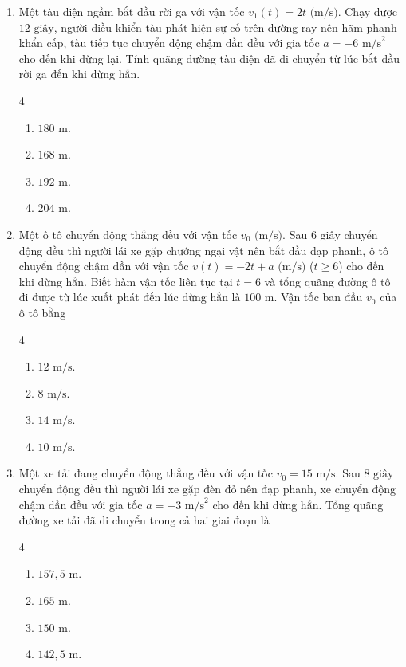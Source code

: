 \documentclass[12pt]{article}
\begin{document}
\begin{enumerate}[label=\textbf{Câu \arabic*.}]
		\item Một tàu điện ngầm bắt đầu rời ga với vận tốc $v_1(t) = 2t\text{ (m/s)}$. Chạy được $12\text{ giây}$, người điều khiển tàu phát hiện sự cố trên đường ray nên hãm phanh khẩn cấp, tàu tiếp tục chuyển động chậm dần đều với gia tốc $a = -6\text{ m/s}^2$ cho đến khi dừng lại. Tính quãng đường tàu điện đã di chuyển từ lúc bắt đầu rời ga đến khi dừng hẳn.
		\begin{multicols}{4}
			\begin{enumerate}[label=\textbf{\Alph*.}]
				\item $180\text{ m}$.
				\item $168\text{ m}$.
				\item $192\text{ m}$.
				\item $204\text{ m}$.
			\end{enumerate}
		\end{multicols}
		
		\item Một ô tô chuyển động thẳng đều với vận tốc $v_0\text{ (m/s)}$. Sau $6\text{ giây}$ chuyển động đều thì người lái xe gặp chướng ngại vật nên bắt đầu đạp phanh, ô tô chuyển động chậm dần với vận tốc $v(t) = -2t + a\text{ (m/s)}$ ($t \ge 6$) cho đến khi dừng hẳn. Biết hàm vận tốc liên tục tại $t = 6$ và tổng quãng đường ô tô đi được từ lúc xuất phát đến lúc dừng hẳn là $100\text{ m}$. Vận tốc ban đầu $v_0$ của ô tô bằng
		\begin{multicols}{4}
			\begin{enumerate}[label=\textbf{\Alph*.}]
				\item $12\text{ m/s}$.
				\item $8\text{ m/s}$.
				\item $14\text{ m/s}$.
				\item $10\text{ m/s}$.
			\end{enumerate}
		\end{multicols}
		
		\item Một xe tải đang chuyển động thẳng đều với vận tốc $v_0 = 15\text{ m/s}$. Sau $8\text{ giây}$ chuyển động đều thì người lái xe gặp đèn đỏ nên đạp phanh, xe chuyển động chậm dần đều với gia tốc $a = -3\text{ m/s}^2$ cho đến khi dừng hẳn. Tổng quãng đường xe tải đã di chuyển trong cả hai giai đoạn là
		\begin{multicols}{4}
			\begin{enumerate}[label=\textbf{\Alph*.}]
				\item $157{,}5\text{ m}$.
				\item $165\text{ m}$.
				\item $150\text{ m}$.
				\item $142{,}5\text{ m}$.
			\end{enumerate}
		\end{multicols}
		

\end{enumerate}
\end{document}
